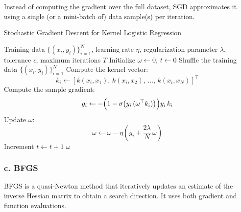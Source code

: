 \documentclass{article}
\begin{document}
Instead of computing the gradient over the full dataset, SGD approximates it using a single (or a mini-batch of) data sample(s) per iteration.

\begin{algorithm}[H]
  \caption{Stochastic Gradient Descent for Kernel Logistic Regression}
  \begin{algorithmic}[1]
  \Require Training data $\{(x_i,y_i)\}_{i=1}^N$, learning rate $\eta$, regularization parameter $\lambda$, tolerance $\epsilon$, maximum iterations $T$
  \State Initialize $\omega \gets 0$, $t \gets 0$
  \Repeat
      \State Shuffle the training data $\{(x_i,y_i)\}_{i=1}^N$
          \State Compute the kernel vector: 
          \[
            k_i \gets [k(x_i,x_1),\, k(x_i,x_2),\, \dots,\, k(x_i,x_N)]^\top
          \]
          \State Compute the sample gradient:
          \[
            g_i \gets -\Bigl(1-\sigma\bigl(y_i\,(\omega^\top k_i)\bigr)\Bigr)y_i\,k_i
          \]
          \State Update $\omega$:
          \[
            \omega \gets \omega - \eta\left(g_i + \frac{2\lambda}{N}\,\omega\right)
          \]
      \EndFor
      \State Increment $t \gets t+1$
  \State \Return $\omega$
  \end{algorithmic}
\end{algorithm}

\subsubsection*{c. BFGS}

BFGS is a quasi-Newton method that iteratively updates an estimate of the inverse Hessian matrix to obtain a search direction. It uses both gradient and function evaluations.
\end{document}
